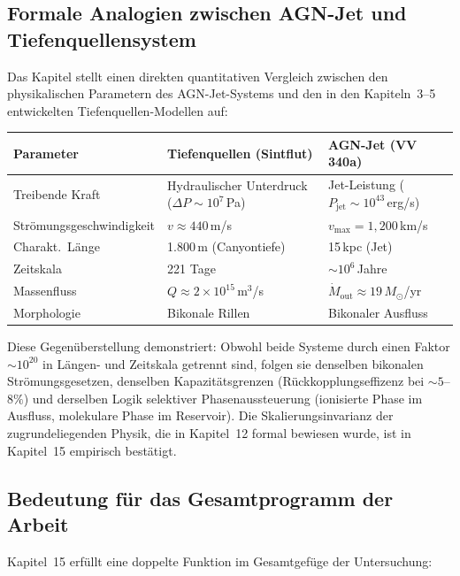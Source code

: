 ﻿\documentclass[12pt,a4paper]{report}
\begin{document}
\subsection{Formale Analogien zwischen AGN-Jet und Tiefenquellensystem}

Das Kapitel stellt einen direkten quantitativen Vergleich zwischen den physikalischen Parametern des AGN-Jet-Systems und den in den Kapiteln~3--5 entwickelten Tiefenquellen-Modellen auf:

\begin{center}
\begin{tabular}{p{4.5cm}p{4.5cm}p{3.8cm}}
	\hline
	\textbf{Parameter} & \textbf{Tiefenquellen (Sintflut)} & \textbf{AGN-Jet (VV\,340a)} \\
	\hline
	Treibende Kraft & Hydraulischer Unterdruck ($\Delta P \sim 10^7$\,Pa) & Jet-Leistung ($P_\mathrm{jet} \sim 10^{43}$\,erg/s) \\
	Strömungsgeschwindigkeit & $v \approx 440$\,m/s & $v_\mathrm{max} = 1{,}200$\,km/s \\
	Charakt.\ Länge & 1.800\,m (Canyontiefe) & 15\,kpc (Jet) \\
	Zeitskala & 221 Tage & $\sim 10^6$\,Jahre \\
	Massenfluss & $Q \approx 2\times10^{15}$\,m$^3$/s & $\dot{M}_\mathrm{out} \approx 19\,M_\odot$/yr \\
	Morphologie & Bikonale Rillen & Bikonaler Ausfluss \\
	\hline
\end{tabular}
\end{center}

Diese Gegenüberstellung demonstriert: Obwohl beide Systeme durch einen Faktor $\sim 10^{20}$ in Längen- und Zeitskala getrennt sind, folgen sie denselben bikonalen Strömungsge\-setzen, denselben Kapazitätsgrenzen (Rückkopplungseffizenz bei $\sim 5$--$8\%$) und derselben Logik selektiver Phasenaussteuerung (ionisierte Phase im Ausfluss, molekulare Phase im Reservoir). Die Skalierungsinvarianz der zugrundeliegenden Physik, die in Kapitel~12 formal bewiesen wurde, ist in Kapitel~15 empirisch bestätigt.

\subsection{Bedeutung für das Gesamtprogramm der Arbeit}

Kapitel~15 erfüllt eine doppelte Funktion im Gesamtgefüge der Untersuchung:
\end{document}
